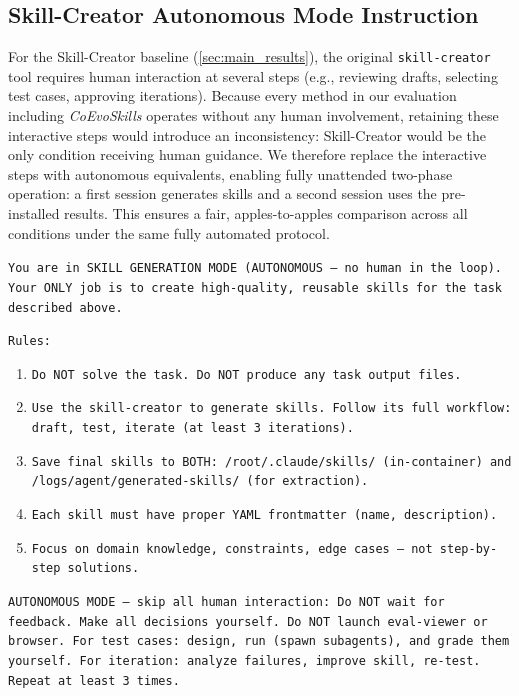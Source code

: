 \documentclass{article}
\newcommand{\method}{\textit{CoEvoSkills}\xspace}
\begin{document}
\subsection{Skill-Creator Autonomous Mode Instruction}
\label{app:prompt_sc}

For the Skill-Creator baseline (\autoref{sec:main_results}), the original \texttt{skill-creator} tool requires human interaction at several steps (e.g., reviewing drafts, selecting test cases, approving iterations). Because every method in our evaluation including \method operates without any human involvement, retaining these interactive steps would introduce an inconsistency: Skill-Creator would be the only condition receiving human guidance. We therefore replace the interactive steps with autonomous equivalents, enabling fully unattended two-phase operation: a first session generates skills and a second session uses the pre-installed results. This ensures a fair, apples-to-apples comparison across all conditions under the same fully automated protocol.

\begin{tcolorbox}[colback=takeawayback, colframe=takeawayframe, title=\textbf{Skill-Creator Generate-Only Instruction}, fonttitle=\small, fontupper=\small]
\texttt{You are in SKILL GENERATION MODE (AUTONOMOUS --- no human in the loop). Your ONLY job is to create high-quality, reusable skills for the task described above.}

\vspace{0.5em}
\texttt{Rules:}
\begin{enumerate}
\item \texttt{Do NOT solve the task. Do NOT produce any task output files.}
\item \texttt{Use the skill-creator to generate skills. Follow its full workflow: draft, test, iterate (at least 3 iterations).}
\item \texttt{Save final skills to BOTH: /root/.claude/skills/ (in-container) and /logs/agent/generated-skills/ (for extraction).}
\item \texttt{Each skill must have proper YAML frontmatter (name, description).}
\item \texttt{Focus on domain knowledge, constraints, edge cases --- not step-by-step solutions.}
\end{enumerate}

\vspace{0.5em}
\texttt{AUTONOMOUS MODE --- skip all human interaction: Do NOT wait for feedback. Make all decisions yourself. Do NOT launch eval-viewer or browser. For test cases: design, run (spawn subagents), and grade them yourself. For iteration: analyze failures, improve skill, re-test. Repeat at least 3 times.}
\end{tcolorbox}
\end{document}
